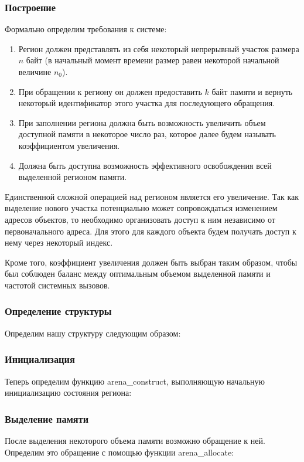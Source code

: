 \documentclass[bachelor, och, coursework]{SCWorks}
\begin{document}
    \subsubsection{Построение}
    Формально определим требования к системе:
    \begin{enumerate}
        \item Регион должен представлять из себя некоторый непрерывный участок размера $n$ байт 
        (в начальный момент времени размер равен некоторой начальной величине $n_0$).
        \item При обращении к региону он должен предоставить $k$ байт памяти и вернуть
        некоторый идентификатор этого участка для последующего обращения.
        \item При заполнении региона должна быть возможность увеличить объем доступной памяти в 
        некоторое число раз, которое далее будем называть
        коэффициентом увеличения.
        \item Должна быть доступна возможность эффективного освобождения всей
        выделенной регионом памяти.
    \end{enumerate}
    Единственной сложной операцией над регионом является его увеличение. 
    Так как выделение нового участка потенциально может сопровождаться изменением адресов объектов, 
    то необходимо организовать доступ к ним независимо от первоначального адреса. Для этого для 
    каждого объекта будем получать доступ к нему через некоторый индекс.

    Кроме того, коэффициент увеличения должен быть выбран таким образом, чтобы был соблюден баланс 
    между оптимальным объемом выделенной памяти и частотой системных вызовов.

    \subsubsection{Определение структуры}
    Определим нашу структуру следующим образом:
    

    \subsubsection{Инициализация}
    Теперь определим функцию arena\_construct, выполняющую начальную инициализацию состояния региона:

    \subsubsection{Выделение памяти}
    После выделения некоторого объема памяти возможно обращение к ней.
    Определим это обращение с помощью функции arena\_allocate:
\end{document}
